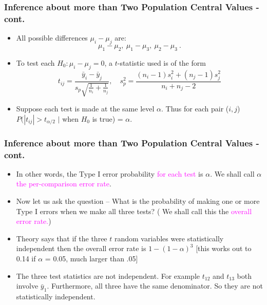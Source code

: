 \documentclass[xcolor=dvipsnames,12pt]{beamer}
\begin{document}
\begin{frame}
\frametitle{Inference about more than Two Population Central Values - cont.}
\begin{itemize}
\item All possible differences $\mu_i-\mu_j$ are:
$$
  \mu_1 - \mu_2, \ \mu_1 - \mu_3, \ \mu_2 - \mu_3 \ .
$$
\item To test each $H_0: \mu_i - \mu_j = 0$, a $t$-statistic used is of the 
form
$$
  t_{ij} = \frac{\bar{y}_i-\bar{y}_j}{s_p\sqrt{\frac{1}{n_i} +
  \frac{1}{n_j}}}, \quad s_p^2 = \frac{(n_i-1)s_i^2 +
(n_j-1)s_j^2}{n_i + n_j - 2}
$$
\item Suppose each test is made at the same level $\alpha$.  Thus for each
pair ($i,j$)\\[.1in]
\hspace*{.5in}$P(|t_{ij}| > t_{\alpha/2}$ $|$ when $H_0$ is true) = $\alpha$.
\end{itemize}
\end{frame}



\begin{frame}
\frametitle{Inference about more than Two Population Central Values - cont.}
\begin{itemize}
\item In other words, the Type I  error probability \textcolor{magenta}{for each test} is
$\alpha$.   We shall call $\alpha$ \textcolor{magenta}{the
per-comparison error rate}.
\item Now let us ask the question -- What is the probability of making one
or more Type I errors when we make all three tests?  ( We shall call
this the \textcolor{magenta}{overall error rate.})
\item Theory says that if the three $t$ random variables were statistically independent
then the overall error rate is $1 - (1-\alpha)^3$ [this works out to 0.14 if
$\alpha$ = 0.05, much larger than .05]
\item The three test statistics are not independent.  For example
$t_{12}$ and   $t_{13}$  both involve $\bar{y}_1$. Furthermore, all three have the same denominator.
So they are not statistically independent.
\end{itemize}
\end{frame}
\end{document}
